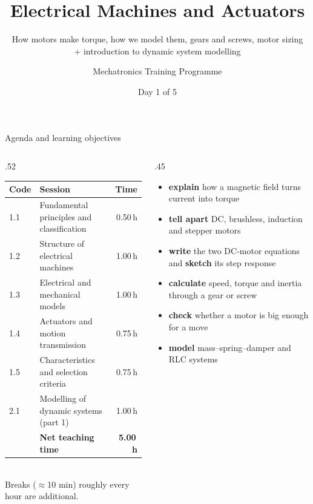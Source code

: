 \documentclass[aspectratio=169,10pt]{beamer}
\title[Electrical Machines and Actuators]{Electrical Machines and Actuators}
\subtitle{How motors make torque, how we model them, gears and screws, motor sizing\\ + introduction to dynamic system modelling}
\author{Mechatronics Training Programme}
\institute{Theoretical Course Series}
\date{Day 1 of 5}
\begin{document}
\begin{frame}[plain]\titlepage\end{frame}

\begin{frame}{Agenda and learning objectives}
\begin{columns}[T]
\begin{column}{.52\textwidth}
\small
\renewcommand{\arraystretch}{1.15}
\begin{tabular}{@{}l p{4.6cm} r@{}}
\toprule
\textbf{Code} & \textbf{Session} & \textbf{Time}\\
\midrule
1.1 & Fundamental principles and classification & 0.50\,h\\
1.2 & Structure of electrical machines & 1.00\,h\\
1.3 & Electrical and mechanical models & 1.00\,h\\
1.4 & Actuators and motion transmission & 0.75\,h\\
1.5 & Characteristics and selection criteria & 0.75\,h\\
2.1 & Modelling of dynamic systems (part 1) & 1.00\,h\\
\midrule
 & \textbf{Net teaching time} & \textbf{5.00\,h}\\
\bottomrule
\end{tabular}\\[1mm]
{\scriptsize\color{mkGray} Breaks ($\approx$10 min) roughly every hour are additional.}
\end{column}
\begin{column}{.45\textwidth}
\begin{defbox}
\small
\begin{itemize}\setlength\itemsep{1pt}
\item \textbf{explain} how a magnetic field turns current into torque
\item \textbf{tell apart} DC, brushless, induction and stepper motors
\item \textbf{write} the two DC-motor equations and \textbf{sketch} its step response
\item \textbf{calculate} speed, torque and inertia through a gear or screw
\item \textbf{check} whether a motor is big enough for a move
\item \textbf{model} mass--spring--damper and RLC systems
\end{itemize}
\end{defbox}
\end{column}
\end{columns}
\end{frame}
\end{document}
